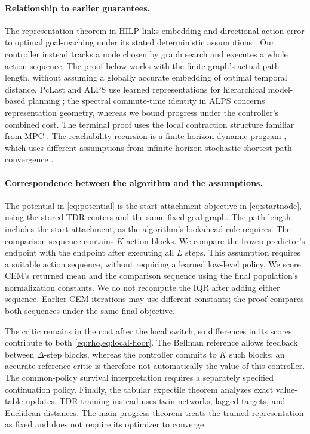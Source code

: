 \documentclass{article}
\theoremstyle{definition}
\theoremstyle{remark}
\begin{document}
\paragraph{Relationship to earlier guarantees.}
The representation theorem in HILP links embedding and directional-action error to
optimal goal-reaching under its stated deterministic assumptions \citep{hilp}.
Our controller instead tracks a node chosen by graph search and executes a whole action
sequence. The proof below works with the finite graph's actual path length, without
assuming a globally accurate embedding of optimal temporal distance.
PcLast and ALPS use learned representations for hierarchical model-based planning
\citep{pclast,alps}; the spectral commute-time identity in ALPS concerns representation
geometry, whereas we bound progress under the controller's combined cost.
The terminal proof uses the local contraction structure familiar from MPC
\citep{mayne2000}. The reachability recursion is a finite-horizon dynamic program
\citep{abate2008},
which uses different assumptions from infinite-horizon stochastic shortest-path convergence
\citep{bertsekas1991}.

\paragraph{Correspondence between the algorithm and the assumptions.}
The potential in \cref{eq:potential} is the start-attachment objective in
\cref{eq:startnode}, using the stored TDR centers and the same fixed goal graph.
The path length includes the start attachment, as the algorithm's lookahead rule requires.
The comparison sequence contains $K$ action blocks. We compare the frozen predictor's
endpoint with the endpoint after executing all $L$ steps. This assumption requires a
suitable action sequence, without requiring a learned low-level policy.
We score CEM's returned mean and the comparison sequence using the final population's
normalization constants. We do not recompute the IQR after adding either sequence.
Earlier CEM iterations may use different constants; the proof compares both sequences
under the same final objective.

The critic remains in the cost after the local switch, so differences in its scores contribute
to both \cref{eq:rho,eq:local-floor}. The Bellman reference allows feedback between
$\Delta$-step blocks, whereas the controller commits to $K$ such blocks; an accurate
reference critic is therefore not automatically the value of this controller.
The common-policy survival interpretation requires a separately specified continuation
policy. Finally, the tabular expectile theorem analyzes exact value-table updates.
TDR training instead uses twin networks, lagged targets, and Euclidean distances.
The main progress theorem treats the trained representation as fixed and does not
require its optimizer to converge.
\end{document}
